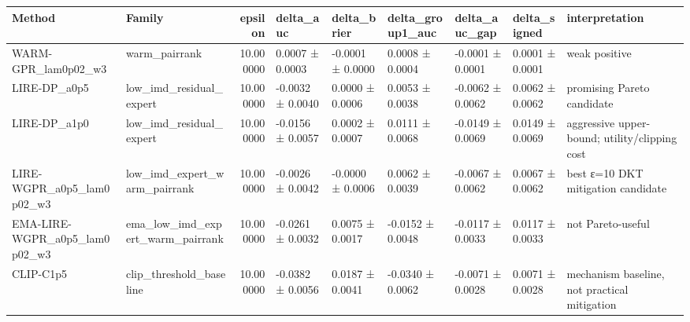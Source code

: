 \begin{tabular}{llrllllll}
\toprule
Method & Family & epsilon & delta_auc & delta_brier & delta_group1_auc & delta_auc_gap & delta_signed & interpretation \\
\midrule
WARM-GPR_lam0p02_w3 & warm_pairrank & 10.000000 & 0.0007 ± 0.0003 & -0.0001 ± 0.0000 & 0.0008 ± 0.0004 & -0.0001 ± 0.0001 & 0.0001 ± 0.0001 & weak positive \\
LIRE-DP_a0p5 & low_imd_residual_expert & 10.000000 & -0.0032 ± 0.0040 & 0.0000 ± 0.0006 & 0.0053 ± 0.0038 & -0.0062 ± 0.0062 & 0.0062 ± 0.0062 & promising Pareto candidate \\
LIRE-DP_a1p0 & low_imd_residual_expert & 10.000000 & -0.0156 ± 0.0057 & 0.0002 ± 0.0007 & 0.0111 ± 0.0068 & -0.0149 ± 0.0069 & 0.0149 ± 0.0069 & aggressive upper-bound; utility/clipping cost \\
LIRE-WGPR_a0p5_lam0p02_w3 & low_imd_expert_warm_pairrank & 10.000000 & -0.0026 ± 0.0042 & -0.0000 ± 0.0006 & 0.0062 ± 0.0039 & -0.0067 ± 0.0062 & 0.0067 ± 0.0062 & best ε=10 DKT mitigation candidate \\
EMA-LIRE-WGPR_a0p5_lam0p02_w3 & ema_low_imd_expert_warm_pairrank & 10.000000 & -0.0261 ± 0.0032 & 0.0075 ± 0.0017 & -0.0152 ± 0.0048 & -0.0117 ± 0.0033 & 0.0117 ± 0.0033 & not Pareto-useful \\
CLIP-C1p5 & clip_threshold_baseline & 10.000000 & -0.0382 ± 0.0056 & 0.0187 ± 0.0041 & -0.0340 ± 0.0062 & -0.0071 ± 0.0028 & 0.0071 ± 0.0028 & mechanism baseline, not practical mitigation \\
\bottomrule
\end{tabular}
